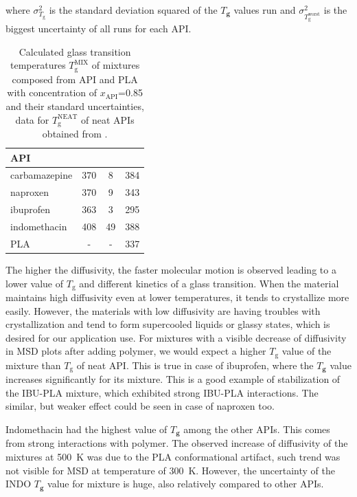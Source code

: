 where $\sigma_{T_{\text{g}}^\text{}}^2$ is the standard deviation squared of the $T_\textbf{g}$ values run and  $\sigma_{T_{\text{g}}^\text{worst}}^2$ is the biggest uncertainty of all runs for each API.

\begin{table}[H]
	\caption{Calculated glass transition temperatures $T_\text{g}^\text{MIX}$ of mixtures composed from API and PLA with concentration of $x_\text{API}$=0.85 and their standard uncertainties, data for $T_\text{g}^\text{NEAT}$ of neat APIs obtained from \cite{cervinka_structure_2021}.}
	\centering
	\vspace{-0.2cm}
	\begin{tabular}{lccc} \toprule
		{\textbf{API}} & {\textbf{\boldmath{$T_{\text{g}}^\text{MIX}$}}} & \textbf{{\boldmath{$\sigma_{T_{\text{g}}^\text{MIX}}$}}} &
		\textbf{\boldmath{$T_{\text{g}}^\text{NEAT}$}}\\
		\midrule
		carbamazepine  & 370 & 8 & 384\\		
		naproxen   & 370 & 9 & 343\\
		ibuprofen  & 363 & 3 & 295\\
		indomethacin  & 408 & 49 & 388\\
		PLA & - & - & 337\\
		\bottomrule
	\end{tabular}
	\label{tab:Tg_mix} 
	\vspace{-0.2cm}
\end{table} 

\newpage
The higher the diffusivity, the faster molecular motion is observed leading to a lower value of $T_\text{g}$ and different kinetics of a glass transition. When the material maintains high diffusivity even at lower temperatures, it tends to crystallize more easily. However, the materials with low diffusivity are having troubles with crystallization and tend to form supercooled liquids or glassy states, which is desired for our application use. For mixtures with a visible decrease of diffusivity in MSD plots after adding polymer, we would expect a higher $T_\text{g}$ value of the mixture than $T_\text{g}$ of neat API. This is true in case of ibuprofen, where the $T_\textbf{g}$ value increases significantly for its mixture. This is a good example of stabilization of the IBU-PLA mixture, which exhibited strong IBU-PLA interactions. The similar, but weaker effect could be seen in case of naproxen too.

Indomethacin had the highest value of $T_\textbf{g}$ among the other APIs. This comes from strong interactions with polymer. The observed increase of diffusivity of the mixtures at 500~K was due to the PLA conformational artifact, such trend was not visible for MSD at temperature of 300~K. However, the uncertainty of the INDO $T_\textbf{g}$ value for mixture is huge, also relatively compared to other APIs.

